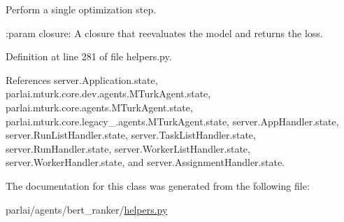\begin{DoxyVerb}Perform a single optimization step.

:param closure:
    A closure that reevaluates the model and returns the loss.
\end{DoxyVerb}
 

Definition at line 281 of file helpers.\+py.



References server.\+Application.\+state, parlai.\+mturk.\+core.\+dev.\+agents.\+M\+Turk\+Agent.\+state, parlai.\+mturk.\+core.\+agents.\+M\+Turk\+Agent.\+state, parlai.\+mturk.\+core.\+legacy\+\_.\+agents.\+M\+Turk\+Agent.\+state, server.\+App\+Handler.\+state, server.\+Run\+List\+Handler.\+state, server.\+Task\+List\+Handler.\+state, server.\+Run\+Handler.\+state, server.\+Worker\+List\+Handler.\+state, server.\+Worker\+Handler.\+state, and server.\+Assignment\+Handler.\+state.



The documentation for this class was generated from the following file\+:\begin{DoxyCompactItemize}
\item 
parlai/agents/bert\+\_\+ranker/\hyperlink{helpers_8py}{helpers.\+py}\end{DoxyCompactItemize}
